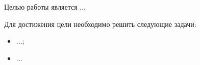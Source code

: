 

Целью работы является ...

Для достижения цели необходимо решить следующие задачи:
\begin{itemize}
    \item ...;
    \item ...
\end{itemize}
